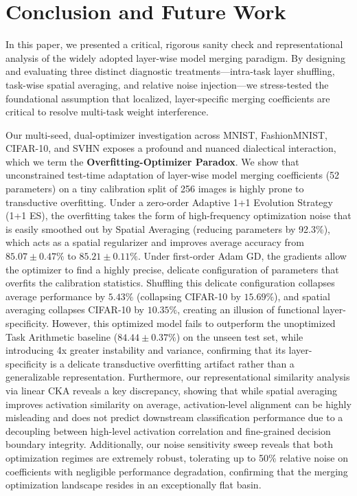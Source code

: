 \section{Conclusion and Future Work}
\label{sec:conclusion}

In this paper, we presented a critical, rigorous sanity check and representational analysis of the widely adopted layer-wise model merging paradigm. By designing and evaluating three distinct diagnostic treatments---intra-task layer shuffling, task-wise spatial averaging, and relative noise injection---we stress-tested the foundational assumption that localized, layer-specific merging coefficients are critical to resolve multi-task weight interference. 

Our multi-seed, dual-optimizer investigation across MNIST, FashionMNIST, CIFAR-10, and SVHN exposes a profound and nuanced dialectical interaction, which we term the \textbf{Overfitting-Optimizer Paradox}. We show that unconstrained test-time adaptation of layer-wise model merging coefficients (52 parameters) on a tiny calibration split of 256 images is highly prone to transductive overfitting. Under a zero-order Adaptive 1+1 Evolution Strategy (1+1 ES), the overfitting takes the form of high-frequency optimization noise that is easily smoothed out by Spatial Averaging (reducing parameters by 92.3\%), which acts as a spatial regularizer and improves average accuracy from $85.07 \pm 0.47\%$ to $85.21 \pm 0.11\%$. Under first-order Adam GD, the gradients allow the optimizer to find a highly precise, delicate configuration of parameters that overfits the calibration statistics. Shuffling this delicate configuration collapses average performance by $5.43\%$ (collapsing CIFAR-10 by $15.69\%$), and spatial averaging collapses CIFAR-10 by $10.35\%$, creating an illusion of functional layer-specificity. However, this optimized model fails to outperform the unoptimized Task Arithmetic baseline ($84.44 \pm 0.37\%$) on the unseen test set, while introducing 4x greater instability and variance, confirming that its layer-specificity is a delicate transductive overfitting artifact rather than a generalizable representation. Furthermore, our representational similarity analysis via linear CKA reveals a key discrepancy, showing that while spatial averaging improves activation similarity on average, activation-level alignment can be highly misleading and does not predict downstream classification performance due to a decoupling between high-level activation correlation and fine-grained decision boundary integrity. Additionally, our noise sensitivity sweep reveals that both optimization regimes are extremely robust, tolerating up to 50\% relative noise on coefficients with negligible performance degradation, confirming that the merging optimization landscape resides in an exceptionally flat basin.

